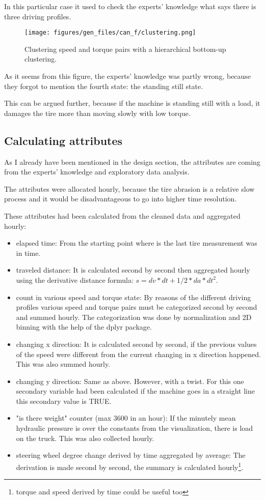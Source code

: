 	In this particular case it used to check the experts' knowledge what says there is three driving profiles.
	\begin{figure}[H]
			\centering
			\texttt{[image: figures/gen\_files/can\_f/clustering.png]}
			\caption{Clustering speed and torque pairs with a hierarchical bottom-up clustering.} 
	\end{figure}
	As it seems from this figure, the experts' knowledge was partly wrong, because they forgot to mention the fourth state: the standing still state.

	This can be argued further, because if the machine is standing still with a load, it damages the tire more than moving slowly with low torque.
\newpage
\subsection{Calculating attributes}
As I already have been mentioned in the design section, the attributes are coming from the experts' knowledge and exploratory data analysis.

The attributes were allocated hourly, because the tire abrasion is a relative slow process and it would be disadvantageous to go into higher time resolution.

These attributes had been calculated from the cleaned data and aggregated hourly:
	\begin{itemize}
		\item{elapsed time:} From the starting point where is the last tire measurement was in time.
		\item{traveled distance:} It is calculated second by second then aggregated hourly using the derivative distance formula: $s = dv*dt + 1/2*da*dt^2$.
		\item{count in various speed and torque state:} By reasons of the different driving profiles various speed and torque pairs must be categorized second by second and summed hourly. The categorization was done by normalization and 2D binning with the help of the dplyr package.
		\item{changing x direction:} It is calculated second by second, if the previous values of the speed were different from the current changing in x direction happened. This was also summed hourly.
		\item{changing y direction:} Same as above. However, with a twist. For this one secondary variable had been calculated if the machine goes in a straight line this secondary value is TRUE.
		\item{"is there weight" counter (max 3600 in an hour):} If the minutely mean hydraulic pressure is over the constants from the visualization, there is load on the truck. This was also collected hourly.
		\item{steering wheel degree change derived by time aggregated by average:} The derivation is made second by second, the summary is calculated hourly\footnote{torque and speed derived by time could be useful too}.
	\end{itemize}
